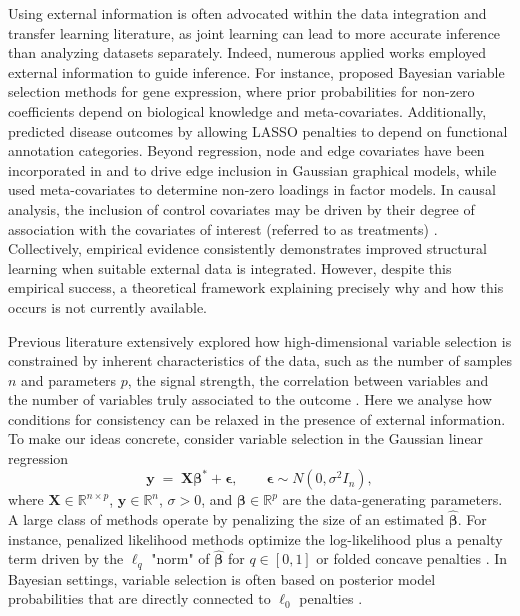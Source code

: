 \documentclass[bj,authoryear]{imsart}
\theoremstyle{plain}
\newcommand{\R}{\mathbb{R}}
\newcommand{\bs}{\boldsymbol}
\begin{document}
Using external information is often advocated within the data integration and transfer learning literature, as joint learning can lead to more accurate inference than analyzing datasets separately. Indeed, numerous applied works employed external information to guide inference. For instance, \cite{stingo:2011, cassese:2014} proposed Bayesian variable selection methods for gene expression, where prior probabilities for non-zero coefficients depend on biological knowledge and meta-covariates. Additionally, \cite{chen_tinghuei:2021} predicted disease outcomes by allowing LASSO penalties to depend on functional annotation categories. Beyond regression, node and edge covariates have been incorporated in \cite{peterson} and \cite{jewson2023graphical} to drive edge inclusion in Gaussian graphical models, while \cite{schiavon2022generalized} used meta-covariates to determine non-zero loadings in factor models. In causal analysis, the inclusion of control covariates may be driven by their degree of association with the covariates of interest (referred to as treatments) 
\citep{belloni2014inference,antonelli2021bayesian}. Collectively, empirical evidence consistently demonstrates improved structural learning when suitable external data is integrated. However, despite this empirical success, a theoretical framework explaining precisely why and how this occurs is not currently available.

Previous literature extensively explored how high-dimensional variable selection is constrained by inherent characteristics of the data, such as the number of samples $n$ and parameters $p$, the signal strength, the correlation between variables and the number of variables truly associated to the outcome \citep{buhlmannvandegeerbook,handbookbayesvarsel,wainwrighthighdimbook}. Here we analyse how conditions for consistency can be relaxed in the presence of external information. To make our ideas concrete, consider variable selection in the Gaussian linear regression
\begin{equation}\label{eq:linearmodel}
	\bs y \;=\; \bs X \bs \beta^* + \bs\epsilon,\qquad \bs \epsilon \sim N(0,\sigma^2 I_n),
\end{equation}
where $\bs X\in \R^{n\times p}$, $\bs y\in \R^n$, $\sigma >0$, and $\bs \beta \in \mathbb{R}^p$ are the data-generating parameters. A large class of methods operate by penalizing the size of an estimated $\hat{\bs  \beta}$. For instance, penalized likelihood methods optimize the log-likelihood plus a penalty term driven by the $\ell_q$ "norm" of $\hat{\bs  \beta}$ for $q\in [0,1]$  or folded concave penalties \citep{lasso,bertsimas}. 
In Bayesian settings, variable selection is often based on posterior model probabilities that are directly connected to $\ell_0$ penalties \citep{BIC,EBIC,rossell2022concentration}. 
\end{document}

